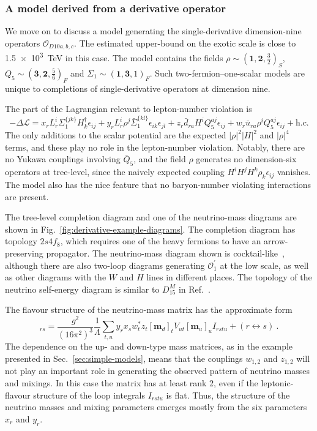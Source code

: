\subsubsection{A model derived from a derivative operator}

We move on to discuss a model generating the single-derivative dimension-nine
operators $\mathcal{O}_{D10a,b,c}$. The estimated upper-bound on the exotic
scale is close to \SI{1.5e3}{\TeV} in this case. The model contains the fields
$\rho \sim (\mathbf{1}, \mathbf{2}, \tfrac{3}{2})_{S}$,
$Q_{5} \sim (\mathbf{3}, \mathbf{2}, \tfrac{5}{6})_{F}$ and
$\Sigma_{1} \sim (\mathbf{1}, \mathbf{3}, 1)_{F}$. Such two-fermion--one-scalar
models are unique to completions of single-derivative operators at dimension
nine.

The part of the Lagrangian relevant to lepton-number violation is
\begin{equation}
  - \Delta \mathscr{L} = x_{r} L_{r}^{i} \Sigma_{1}^{\{jk\}} H^{\dagger}_{k} \epsilon_{ij} + y_{r} L_{r}^{i} \rho^{j} \bar{\Sigma}_{1}^{\{kl\}}\epsilon_{ik}\epsilon_{jl} + z_{r} \bar{d}_{ra} H^{i} Q^{aj}_{5} \epsilon_{ij} + w_{r} \bar{u}_{ra} \rho^{i} Q_{5}^{aj} \epsilon_{ij} + \text{h.c.}
\end{equation}
The only additions to the scalar potential are the expected $|\rho|^{2}|H|^{2}$
and $|\rho|^{4}$ terms, and these play no role in the lepton-number violation.
Notably, there are no Yukawa couplings involving $\bar{Q}_{5}$, and the field
$\rho$ generates no dimension-six operators at tree-level, since the naively
expected coupling $H^{i}H^{j}H^{k}\rho_{k} \epsilon_{ij}$ vanishes. The model
also has the nice feature that no baryon-number violating interactions are
present.

The tree-level completion diagram and one of the neutrino-mass diagrams are
shown in Fig.~\ref{fig:derivative-example-diagrams}. The completion diagram has
topology $2s4f_{8}$, which requires one of the heavy fermions to have an
arrow-preserving propagator. The neutrino-mass diagram shown is
cocktail-like~\cite{Gustafsson:2012vj}, although there are also two-loop diagrams generating
$\mathcal{O}_{1}^{\prime}$ at the low scale, as well as other diagrams with the
$W$ and $H$ lines in different places. The topology of the neutrino self-energy
diagram is similar to $D^{M}_{15}$ in Ref.~\cite{Cepedello:2018rfh}.

The flavour structure of the neutrino-mass matrix has the approximate form
\begin{equation}
  [\mathbf{m}_{\nu}]_{rs} = \frac{g^{2}}{(16\pi^{2})^{3}} \frac{1}{\Lambda} \sum_{t,u} y_{r} x_{s} w^{*}_{t} z_{t} [\mathbf{m}_{d}]_{t} V_{ut} [\mathbf{m}_{u}]_{u} I_{rstu} + (r \leftrightarrow s) \ .
\end{equation}
The dependence on the up- and down-type mass matrices, as in the example
presented in Sec.~\ref{sec:simple-models}, means that the couplings $w_{1,2}$
and $z_{1,2}$ will not play an important role in generating the observed pattern
of neutrino masses and mixings. In this case the matrix has at least rank 2,
even if the leptonic-flavour structure of the loop integrals $I_{rstu}$ is flat.
Thus, the structure of the neutrino masses and mixing parameters emerges mostly
from the six parameters $x_{r}$ and $y_{r}$.

